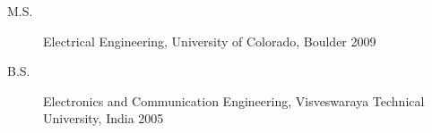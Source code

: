 
\begin{description}
\item[M.S.] Electrical Engineering, University of Colorado, Boulder \hfill2009
\item[B.S.] Electronics and Communication Engineering, Visveswaraya Technical University, India \hfill2005
\end{description}


